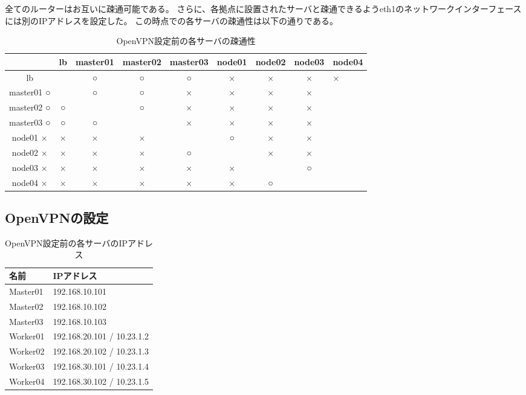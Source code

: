 全てのルーターはお互いに疎通可能である。
さらに、各拠点に設置されたサーバと疎通できるようeth1のネットワークインターフェースには別のIPアドレスを設定した。
この時点での各サーバの疎通性は以下の通りである。

\begin{table}[htb]
  \begin{center}
    \caption{OpenVPN設定前の各サーバの疎通性}
    \begin{tabular}{|c|c|c|c|c|c|c|c|} \hline
      & lb & master01 & master02 & master03 & node01 & node02 & node03 & node04 \\ \hline
      lb & \ & ○ & ○ & ○ & × & × & × & × \\ \hline
      master01 ○ & \ & ○ & ○ & × & × & × & × \\ \hline
      master02 ○ & ○ & \ & ○ & × & × & × & × \\ \hline
      master03 ○ & ○ & ○ & \ & × & × & × & × \\ \hline
      node01 × & × & × & × & \ & ○ & × & × \\ \hline
      node02 × & × & × & × & ○ & \ & × & × \\ \hline
      node03 × & × & × & × & × & × & \ & ○ \\ \hline
      node04 × & × & × & × & × & × & ○ & \ \\ \hline
    \end{tabular}
  \end{center}
\end{table}

\subsection{OpenVPNの設定}

\begin{table}[htb]
  \begin{center}
    \caption{OpenVPN設定前の各サーバのIPアドレス}
    \begin{tabular}{|l|l|} \hline
      名前 & IPアドレス \\ \hline
      Master01 & 192.168.10.101 \\ \hline
      Master02 & 192.168.10.102 \\ \hline
      Master03 & 192.168.10.103 \\ \hline
      Worker01 & 192.168.20.101 / 10.23.1.2 \\ \hline
      Worker02 & 192.168.20.102 / 10.23.1.3 \\ \hline
      Worker03 & 192.168.30.101 / 10.23.1.4 \\ \hline
      Worker04 & 192.168.30.102 / 10.23.1.5 \\ \hline
    \end{tabular}
  \end{center}
\end{table}

